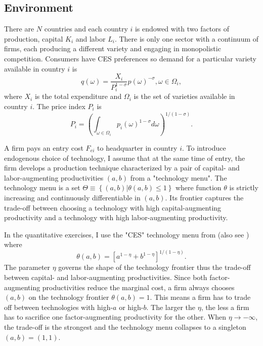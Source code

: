 \documentclass[notitlepage,11pt]{article}%
\begin{document}
\subsection{Environment}

There are $N$ countries and each country $i$ is endowed with two factors of
production, capital $K_{i}$ and labor $L_{i}$. There is only one sector with a
continuum of firms, each producing a different variety and engaging in
monopolistic competition. Consumers have CES preferences so demand for a
particular variety available in country $i$ is%
\[
q\left(  \omega\right)  =\frac{X_{i}}{P_{i}^{1-\sigma}}p\left(  \omega\right)
^{-\sigma},\omega\in\Omega_{i},
\]
where $X_{i}$ is the total expenditure and $\Omega_{i}$ is the set of
varieties available in country $i$. The price index $P_{i}$ is%
\[
P_{i}=\left(  \int_{\omega\in\Omega_{i}}p_{i}\left(  \omega\right)
^{1-\sigma}d\omega\right)  ^{1/\left(  1-\sigma\right)  }.
\]


A firm pays an entry cost $F_{ei}$ to headquarter in country $i$. To introduce
endogenous choice of technology, I assume that at the same time of entry, the
firm develops a production technique characterized by a pair of capital- and
labor-augmenting productivities $\left(  a,b\right)  $ from a "technology
menu". The technology menu is a set $\Theta\equiv\left\{  \left(  a,b\right)
|\theta\left(  a,b\right)  \leq1\right\}  $ where function $\theta$ is
strictly increasing and continuously differentiable in $\left(  a,b\right)  $.
Its frontier captures the trade-off between choosing a technology with high
capital-augmenting productivity and a technology with high labor-augmenting productivity.

In the quantitative exercises, I use the "CES" technology menu from
\cite{caselli_world_2006} (also see \cite{oberfield_micro_2014}) where%
\[
\theta\left(  a,b\right)  =\left[  a^{1-\eta}+b^{1-\eta}\right]  ^{1/\left(
1-\eta\right)  }.
\]
The parameter $\eta$ governs the shape of the technology frontier thus the
trade-off between capital- and labor-augmenting productivities. Since both
factor-augmenting productivities reduce the marginal cost, a firm always
chooses $\left(  a,b\right)  $ on the technology frontier $\theta\left(
a,b\right)  =1$. This means a firm has to trade off between technologies with
high-$a$ or high-$b$. The larger the $\eta$, the less a firm has to sacrifice
one factor-augmenting productivity for the other. When $\eta\rightarrow
-\infty$, the trade-off is the strongest and the technology menu collapses to
a singleton $\left(  a,b\right)  =\left(  1,1\right)  $.
\end{document}
